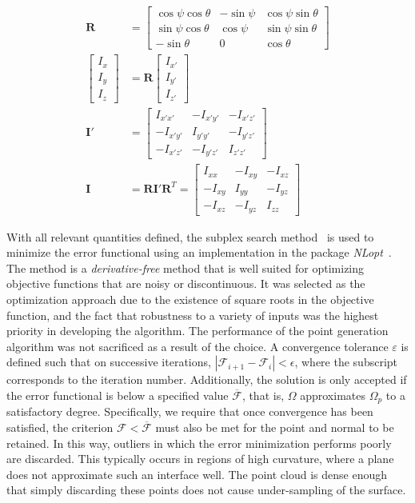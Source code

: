 \begin{align}
\bm{R} &= \left[\begin{array} {ccc} {\cos\psi\cos\theta} & {-\sin\psi} & {\cos\psi\sin\theta}\\ {\sin\psi\cos\theta} & {\cos\psi} & {\sin\psi\sin\theta} \\
{-\sin\theta} & {0} & {\cos\theta}\end{array} \right] \\
\left[\begin{array} {ccc} {I_x} \\ {I_y} \\ {I_z} \end{array} \right] &= \bm{R} \left[\begin{array} {ccc} {I_{x'}} \\ {I_{y'}} \\ {I_{z'}} \end{array} \right]\\
\bm{I}' &= \left[\begin{array} {ccc} {I_{x'x'}} & {-I_{x'y'}} & {-I_{x'z'}}\\ {-I_{x'y'}} & {I_{y'y'}} & {-I_{y'z'}} \\ -{I_{x'z'}} & {-I_{y'z'}} & {I_{z'z'}} \end{array} \right] \\
\bm{I} &= \bm{R}\bm{I}'\mathbf{R}^T = \left[\begin{array} {ccc} {I_{xx}} & {-I_{xy}} & {-I_{xz}}\\ {-I_{xy}} & {I_{yy}} & {-I_{yz}} \\ -{I_{xz}} & {-I_{yz}} & {I_{zz}} \end{array} \right]
\end{align}

With all relevant quantities defined, the subplex search method~\cite{rowan} is used to minimize the error functional using an implementation in the package \textit{NLopt}~\cite{nlo}. The method is a \textit{derivative-free} method that is well suited for optimizing objective functions that are noisy or discontinuous. It was selected as the optimization approach due to the existence of square roots in the objective function, and the fact that robustness to a variety of inputs was the highest priority in developing the algorithm. The performance of the point generation algorithm was not sacrificed as a result of the choice. A convergence tolerance $\varepsilon$ is defined such that on successive iterations, $\left| \mathcal{F}_{i+1} - \mathcal{F}_{i}\right| < \epsilon$, where the subscript corresponds to the iteration number. Additionally, the solution is only accepted if the error functional is below a specified value $\overline{\mathcal{F}}$, that is, $\Omega$ approximates $\Omega_p$ to a satisfactory degree. Specifically, we require that once convergence has been satisfied, the criterion $\mathcal{F} < \overline{\mathcal{F}}$ must also be met for the point and normal to be retained. In this way, outliers in which the error minimization performs poorly are discarded. This typically occurs in regions of high curvature, where a plane does not approximate such an interface well. The point cloud is dense enough that simply discarding these points does not cause under-sampling of the surface.

